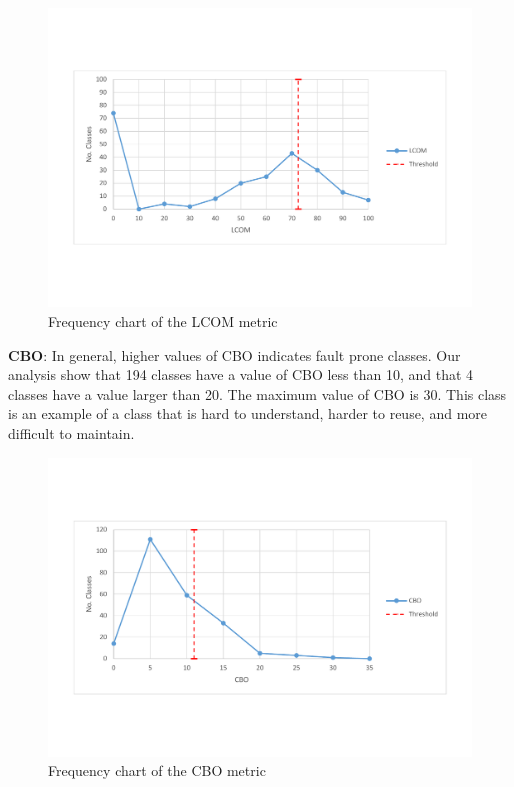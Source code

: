 \begin{figure}
	\centering
	\includegraphics[width=\textwidth]{images/threshold/lcom.pdf}
	\caption{Frequency chart of the LCOM metric}
	\label{fig:lcomdistribution}
\end{figure}



\textbf{CBO}: In general, higher values of CBO indicates fault prone classes. Our analysis show that 194 classes have a value of CBO less than 10, and that 4 classes have a value larger than 20. The maximum value of CBO is 30. This class is an example of a class that is hard to understand, harder to reuse, and more difficult to maintain. 


\begin{figure}
	\centering
	\includegraphics[width=\textwidth]{images/threshold/cbo.pdf}
	\caption{Frequency chart of the CBO metric}
	\label{fig:cbodistribution}
\end{figure}



